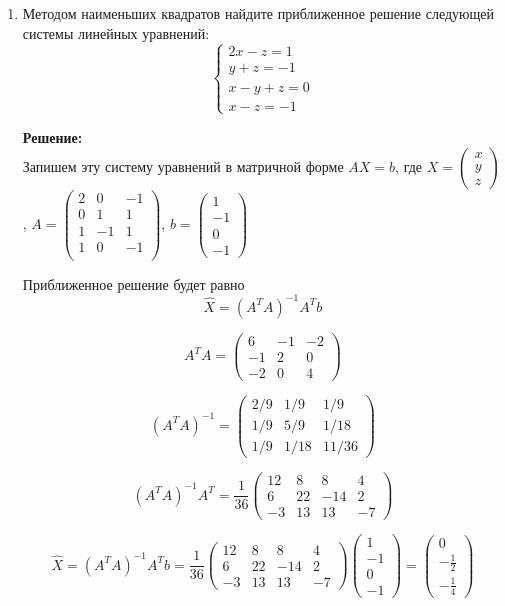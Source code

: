 \documentclass[a4paper,12pt]{article}
\newcounter{z}
\newcommand{\z}{\refstepcounter{z}\vskip 20pt\noindent
\fbox{\textbf{\arabic{z}}} }
\begin{document}
\begin{enumerate}
\vspace{5pt}

\item Методом наименьших квадратов найдите приближенное решение следующей системы линейных уравнений:
\[
\begin{cases}
2x - z = 1\\
 y + z = -1\\
x - y + z = 0\\
x - z = -1
\end{cases}
\]
\vspace{5pt}

\textbf{Решение:}\\
Запишем эту систему уравнений в матричной форме $AX = b$, где $X=\begin{pmatrix}
x\\y\\z
\end{pmatrix}$, $A=\begin{pmatrix}
2&0&-1\\
0&1&1\\
1&-1&1\\
1&0&-1\\
\end{pmatrix}$, $b=\begin{pmatrix}
1\\-1\\0\\-1
\end{pmatrix}$

Приближенное решение будет равно 
\[ 
\widehat{X}= \left(A^T A\right)^{-1}A^T b
\]


$$A^T A= \begin{pmatrix}
6&-1&-2\\
-1&2&0\\
-2&0&4
\end{pmatrix}$$

\[ 
\left(A^T A\right)^{-1} = \begin{pmatrix}
2/9& 1/9& 1/9\\
1/9& 5/9& 1/18\\
1/9& 1/18& 11/36
\end{pmatrix}
\]

\[ 
\left(A^T A\right)^{-1}A^T = \frac{1}{36}\begin{pmatrix}
12&8&8&4\\
6&22&-14&2\\
-3&13&13&-7
\end{pmatrix}
\]

\[ 
\widehat{X}= \left(A^T A\right)^{-1}A^T b=\frac{1}{36}\begin{pmatrix}
12&8&8&4\\
6&22&-14&2\\
-3&13&13&-7
\end{pmatrix} \begin{pmatrix}
1\\-1\\0\\-1
\end{pmatrix} = \begin{pmatrix}
0\\
-\frac{1}{2}\\
-\frac{1}{4}
\end{pmatrix}
\]


\end{enumerate}
\end{document}
